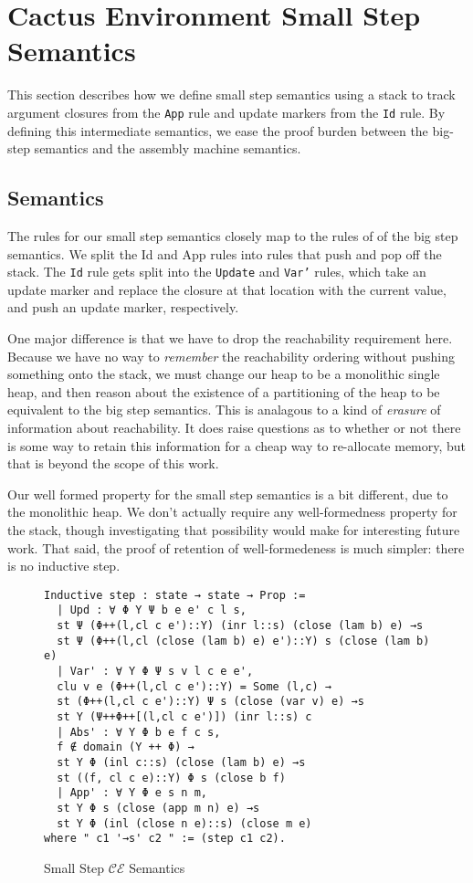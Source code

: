 \section{Cactus Environment Small Step Semantics} \label{sec:cesm}

This section describes how we define small step semantics using a stack to track
argument closures from the \texttt{App} rule and update markers from the
\texttt{Id} rule. By defining this intermediate semantics, we ease the proof
burden between the big-step semantics and the assembly machine semantics.   

\subsection{Semantics}

The rules for our small step semantics closely map to the rules of of the big
step semantics. We split the Id and App rules into rules that push and pop off
the stack. The \texttt{Id} rule gets split into the \texttt{Update} and
\texttt{Var'} rules, which take an update marker and replace the closure at that
location with the current value, and push an update marker, respectively. 

One major difference is that we have to drop the reachability requirement here.
Because we have no way to \emph{remember} the reachability ordering without
pushing something onto the stack, we must change our heap to be a monolithic
single heap, and then reason about the existence of a partitioning of the heap
to be equivalent to the big step semantics. This is analagous to a kind of
\emph{erasure} of information about reachability. It does raise questions as to
whether or not there is some way to retain this information for a cheap way to
re-allocate memory, but that is beyond the scope of this work.

Our well formed property for the small step semantics is a bit different, due to
the monolithic heap. We don't actually require any well-formedness property for
the stack, though investigating that possibility would make for interesting
future work. That said, the proof of retention of well-formedeness is much
simpler: there is no inductive step.   

\begin{figure}
\begin{lstlisting}
Inductive step : state → state → Prop :=
  | Upd : ∀ Φ Υ Ψ b e e' c l s, 
  st Ψ (Φ++(l,cl c e')::Υ) (inr l::s) (close (lam b) e) →s 
  st Ψ (Φ++(l,cl (close (lam b) e) e')::Υ) s (close (lam b) e)
  | Var' : ∀ Υ Φ Ψ s v l c e e', 
  clu v e (Φ++(l,cl c e')::Υ) = Some (l,c) → 
  st (Φ++(l,cl c e')::Υ) Ψ s (close (var v) e) →s 
  st Υ (Ψ++Φ++[(l,cl c e')]) (inr l::s) c
  | Abs' : ∀ Υ Φ b e f c s, 
  f ∉ domain (Υ ++ Φ) → 
  st Υ Φ (inl c::s) (close (lam b) e) →s 
  st ((f, cl c e)::Υ) Φ s (close b f)
  | App' : ∀ Υ Φ e s n m, 
  st Υ Φ s (close (app m n) e) →s 
  st Υ Φ (inl (close n e)::s) (close m e)
where " c1 '→s' c2 " := (step c1 c2).
\end{lstlisting}
\caption{Small Step $\mathcal{CE}$ Semantics}
\end{figure}

